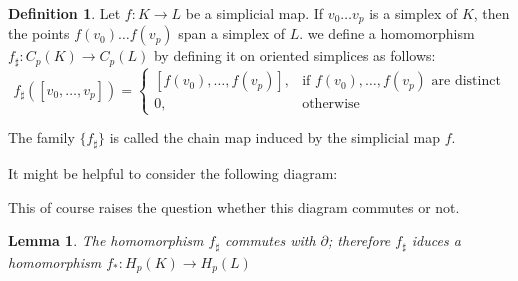 \documentclass[draft]{scrartcl}
\theoremstyle{plain}
\newtheorem{lemma}[theorem]{Lemma}
\theoremstyle{definition}
\newtheorem	{definition}[theorem]{Definition}
\theoremstyle{remark}
\begin{document}
\begin{definition}
	Let $f: K\to L$ be a simplicial map. If $v_0\dots v_p$ is a simplex of $K$, then the points $f(v_0)\dots f(v_p)$ span a simplex of $L$. we define a homomorphism $f_\sharp: C_p(K)\to C_p(L)$ by defining it on oriented simplices as follows:
	\[
	f_\sharp([v_0,\dots,v_p])=\begin{cases}
	[f(v_0),\dots, f(v_p)],& \text{if } f(v_0),\dots, f(v_p) \text{ are distinct}\\
	0,&\text{otherwise}
	\end{cases}
	\]
	
	The family $\{f_\sharp\}$ is called the chain map induced by the simplicial map $f$.
\end{definition}

It might be helpful to consider the following diagram:

\begin{center}
	
\end{center}

This of course raises the question whether this diagram commutes or not. 
\begin{lemma}
	The homomorphism $f_\sharp$ commutes with $\partial$; therefore $f_\sharp$ iduces a homomorphism $f_\ast:H_p(K)\to H_p(L)$
\end{lemma}
\end{document}
